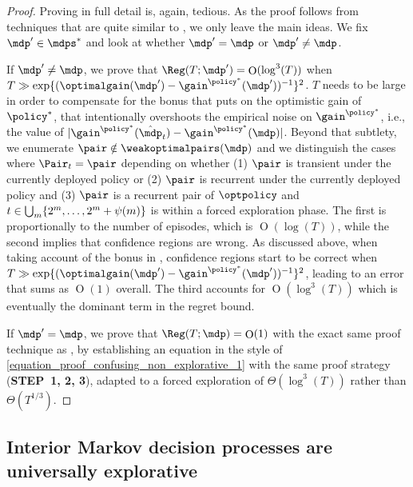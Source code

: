 \documentclass[preprint,cleveref,12pt]{colt2025}
\DeclarePairedDelimiter{\braces}{\{}{\}}	%
\DeclarePairedDelimiter{\abs}{\lvert}{\rvert}	%
\DeclareMathOperator*{\OH}{\mathrm{O}}
\def\model{\mdp}
\def\models{\mdps}
\def\wkoptpairs{\weakoptimalpairs}
\def\optgain{\optimalgain} %
\def\STEP#1{(\strong{STEP~#1})}
\newcommand{\strong}[1]{\textbf{#1}}
\begin{document}
    \bigskip
    \def\proofname{Sketch of proof}
    \begin{proof}
        Proving  in full detail is, again, tedious. 
        As the proof follows from techniques that are quite similar to , we only leave the main ideas. 
        We fix $\model' \in \models^*$ and look at whether $\model' = \model$ or $\model' \ne \model$.

        If $\model' \ne \model$, we prove that $\Reg(T; \model') = \OH(\log^3(T))$ when $T \gg \exp\braces{(\optgain(\model') - \gain^{\policy^*}(\model'))^{-1}}^2$.
        $T$ needs to be large in order to compensate for the bonus that  puts on the optimistic gain of $\policy^*$, that intentionally overshoots the empirical noise on $\gain^{\policy^*}$, i.e., the value of $\abs{\gain^{\policy^*}(\hat{\model}_t) - \gain^{\policy^*}(\model)}$. 
        Beyond that subtlety, we enumerate $\pair \notin \wkoptpairs(\model)$ and we distinguish the cases where $\Pair_t = \pair$ depending on whether (1) $\pair$ is transient under the currently deployed policy or (2) $\pair$ is recurrent under the currently deployed policy and (3) $\pair$ is a recurrent pair of $\optpolicy$ and $t \in \bigcup_m \braces{2^m, \ldots, 2^m + \psi(m)}$ is within a forced exploration phase.
        The first is proportionally to the number of episodes, which is $\OH(\log(T))$, while the second implies that confidence regions are wrong.
        As discussed above, when taking account of the bonus in , confidence regions start to be correct when $T \gg \exp\braces{(\optgain(\model') - \gain^{\policy^*}(\model'))^{-1}}^2$, leading to an error that sums as $\OH(1)$ overall. 
        The third accounts for $\OH(\log^3(T))$ which is eventually the dominant term in the regret bound. 

        If $\model' = \model$, we prove that $\Reg(T; \model) = \OH(1)$ with the exact same proof technique as , by establishing an equation in the style of \eqref{equation_proof_confusing_non_explorative_1} with the same proof strategy \STEP{1, 2, 3}, adapted to a forced exploration of $\Theta(\log^3(T))$ rather than $\Theta(T^{1/3})$. 
    \end{proof}
    \def\proofname{Proof}

    \subsection{Interior Markov decision processes are universally explorative}
    \label{appendix_interior_are_explorative}
    
\end{document}
